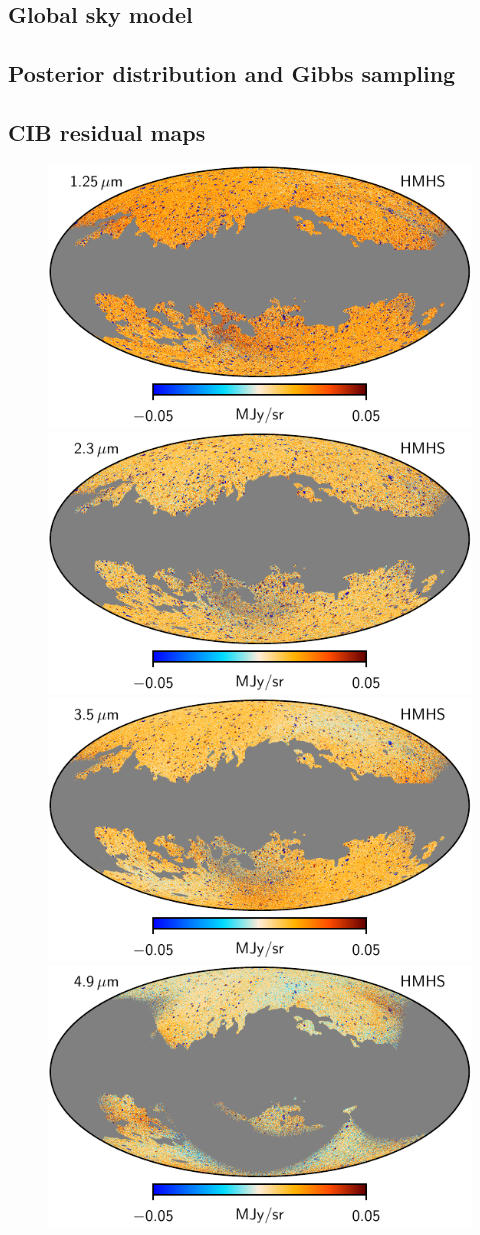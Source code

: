 \documentclass{aa}
\begin{document}
\subsection{Global sky model}

\subsection{Posterior distribution and Gibbs sampling}

\subsection{CIB residual maps}

\begin{figure}
  \centering
  \includegraphics[width=0.42\linewidth]{figs/dirbe_01_hmhs_v1.pdf}\hspace*{5mm}
  \includegraphics[width=0.42\linewidth]{figs/dirbe_02_hmhs_v1.pdf}\\
  \includegraphics[width=0.42\linewidth]{figs/dirbe_03_hmhs_v1.pdf}\hspace*{5mm}
  \includegraphics[width=0.42\linewidth]{figs/dirbe_04_hmhs_v1.pdf}\\

\end{figure}
\end{document}

